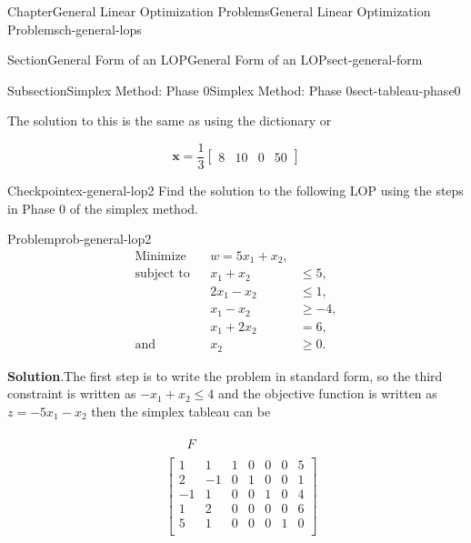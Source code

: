 \documentclass[oneside,10pt,]{book}
\newcommand{\blocktitlefont}{\relax}
\numberwithin{equation}{section}
\newcommand{\amp}{&}
\begin{document}
\begin{chapterptx}{Chapter}{General Linear Optimization Problems}{}{General Linear Optimization Problems}{}{}{ch-general-lops}
\begin{sectionptx}{Section}{General Form of an LOP}{}{General Form of an LOP}{}{}{sect-general-form}
\begin{subsectionptx}{Subsection}{Simplex Method: Phase 0}{}{Simplex Method: Phase 0}{}{}{sect-tableau-phase0}
\begin{equation*}
\end{equation*}
%
\par
The solution to this is the same as using the dictionary or%
\par
%
\begin{equation*}
\boldsymbol{x} = \frac{1}{3}\left[\begin{array}{rr|rr} 8 \amp 10 \amp 0 \amp 50 \end{array}\right]
\end{equation*}
%
\begin{inlineexercise}{Checkpoint}{}{ex-general-lop2}%
Find the solution to the following LOP using the steps in Phase 0 of the simplex method.%
\begin{problem}{Problem}{}{prob-general-lop2}%
%
\begin{equation*}
\begin{aligned} \text{Minimize} \amp\amp w = 5x_1 + x_2,\amp \\ \text{subject to} \amp\amp x_1 + x_2 \amp\leq 5, \\ \amp\amp 2x_1 - x_2 \amp\leq 1, \\ \amp\amp x_1 - x_2 \amp \geq -4, \\ \amp\amp x_1 + 2x_2 \amp = 6, \\ \text{and} \amp\amp x_2 \amp \geq 0.
\end{aligned}
\end{equation*}
%
\end{problem}
\par\smallskip%
\noindent\textbf{\blocktitlefont Solution}.\hypertarget{ex-general-lop2-2}{}\quad{}The first step is to write the problem in standard form, so the third constraint is written as \(-x_1+x_2 \leq 4\) and the objective function is written as \(z = -5x_1-x_2\) then the simplex tableau can be%
\par
%
\begin{align*}
\amp\begin{array}{rrrrrr}\amp \phantom{1} F \end{array}\\
\amp\left[\begin{array}{rr|rrrr|r} 1 \amp 1 \amp 1 \amp 0 \amp 0 \amp 0 \amp 5\\ 2 \amp -1 \amp 0 \amp 1 \amp 0 \amp 0 \amp 1\\ -1 \amp 1 \amp 0 \amp 0 \amp 1 \amp 0 \amp 4\\ 1 \amp 2 \amp 0 \amp 0 \amp 0 \amp 0 \amp 6\\ \hline 5 \amp 1 \amp 0 \amp 0 \amp 0 \amp 1 \amp 0\\ \end{array} \right]

\end{align*}
\end{inlineexercise}
\end{subsectionptx}
\end{sectionptx}
\end{chapterptx}
\end{document}
